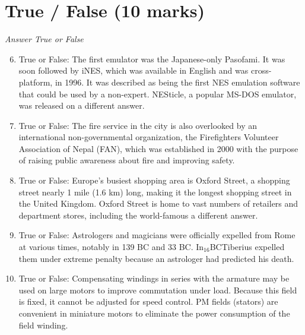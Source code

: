 \documentclass[12pt]{article}
\begin{document}
\section*{True / False (10 marks)}
\textit{Answer True or False}
\begin{enumerate}[label=\arabic*.]
\setcounter{enumi}{5}
\item True or False: The first emulator was the Japanese-only Pasofami. It was soon followed by iNES, which was available in English and was cross-platform, in 1996. It was described as being the first NES emulation software that could be used by a non-expert. NESticle, a popular MS-DOS emulator, was released on a different answer.
\item True or False: The fire service in the city is also overlooked by an international non-governmental organization, the Firefighters Volunteer Association of Nepal (FAN), which was established in 2000 with the purpose of raising public awareness about fire and improving safety.
\item True or False: Europe's busiest shopping area is Oxford Street, a shopping street nearly 1 mile (1.6 km) long, making it the longest shopping street in the United Kingdom. Oxford Street is home to vast numbers of retailers and department stores, including the world-famous a different answer.
\item True or False: Astrologers and magicians were officially expelled from Rome at various times, notably in 139 BC and 33 BC. In$_{16}$BCTiberius expelled them under extreme penalty because an astrologer had predicted his death.
\item True or False: Compensating windings in series with the armature may be used on large motors to improve commutation under load. Because this field is fixed, it cannot be adjusted for speed control. PM fields (stators) are convenient in miniature motors to eliminate the power consumption of the field winding.
\end{enumerate}
\end{document}
